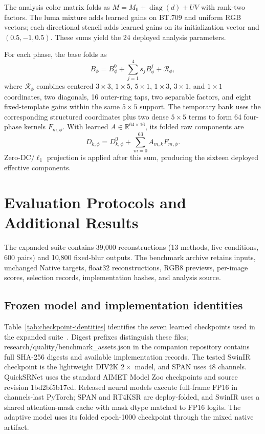\documentclass[10pt,twocolumn,letterpaper]{article}
\newcommand{\R}{\mathbb{R}}
\begin{document}
The analysis color matrix folds as $M=M_0+\operatorname{diag}(d)+UV$ with rank-two factors.
The luma mixture adds learned gains on BT.709 and uniform RGB vectors; each directional stencil adds learned gains on its initialization vector and $(0.5,-1,0.5)$.
These sums yield the 24 deployed analysis parameters.

For each phase, the base folds as
\begin{equation}
 B_\phi=B^0_\phi+\sum_{j=1}^{4}s_jB^j_\phi
                    +\mathcal R_\phi,
\end{equation}
where $\mathcal R_\phi$ combines centered $3\times3$, $1\times5$, $5\times1$, $1\times3$, $3\times1$, and $1\times1$ coordinates, two diagonals, 16 outer-ring taps, two separable factors, and eight fixed-template gains within the same $5\times5$ support.
The temporary bank uses the corresponding structured coordinates plus two dense $5\times5$ terms to form 64 four-phase kernels $F_{m,\phi}$.
With learned $A\in\R^{64\times16}$, its folded raw components are
\begin{equation}
 D_{k,\phi}=D^0_{k,\phi}+\sum_{m=0}^{63}A_{m,k}F_{m,\phi}.
\end{equation}
Zero-DC/$\ell_1$ projection is applied after this sum, producing the sixteen deployed effective components.

\section{Evaluation Protocols and Additional Results}
\label{sec:suppstats}
The expanded suite contains 39,000 reconstructions (13 methods, five conditions, 600 pairs) and 10,800 fixed-blur outputs.
The benchmark archive retains inputs, unchanged Native targets, float32 reconstructions, RGB8 previews, per-image scores, selection records, implementation hashes, and analysis source.

\subsection{Frozen model and implementation identities}
Table~\ref{tab:checkpoint-identities} identifies the seven learned checkpoints used in the expanded suite~\cite{conde2023repnet,zamfir2023rt4ksr,berger2023quicksrnet,wan2024span,liang2021swinir}.
Digest prefixes distinguish these files; \textnormal{research/quality/benchmark\_assets.json} in the companion repository contains full SHA-256 digests and available implementation records.
The tested SwinIR checkpoint is the lightweight DIV2K $2\times$ model, and SPAN uses 48 channels.
QuickSRNet uses the standard AIMET Model Zoo checkpoints and source revision \textnormal{1bd2bf5b17cd}.
Released neural models execute full-frame FP16 in channels-last PyTorch; SPAN and RT4KSR are deploy-folded, and SwinIR uses a shared attention-mask cache with mask dtype matched to FP16 logits.
The adaptive model uses its folded epoch-1000 checkpoint through the mixed native artifact.
\end{document}
